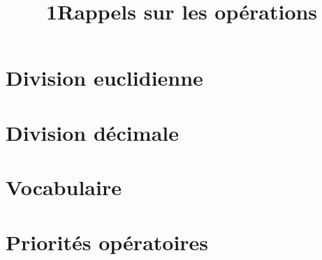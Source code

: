\documentclass[12pt,a4paper]{article}
\date{}
\title{\textcircled{{\normalsize{1}}}Rappels sur les opérations}
\begin{document}
\maketitle








\section{Division euclidienne}






%
%
%
%
%

\section{Division décimale}




\section{Vocabulaire}



\newpage

\section{Priorités opératoires}


\end{document}
